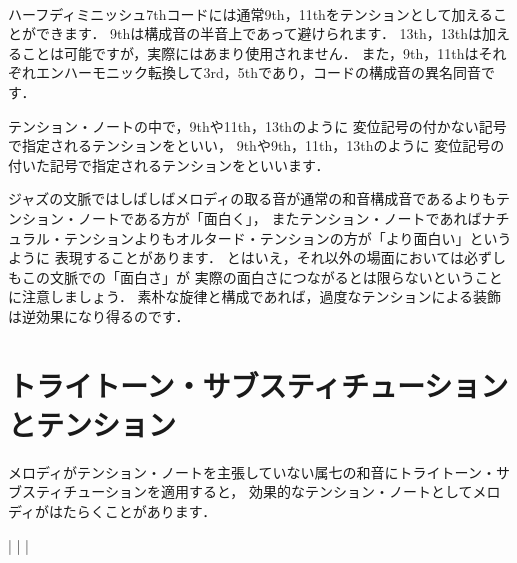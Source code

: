 \documentclass[dvipdfmx,uplatex,b5paper,openany,jbase=12Q,nomag*,textwidth-limit=44%
               ]{gachimuchi}
\begin{document}
\begin{description}
\begin{Music}
    \en%
    \endpiece
  \end{Music}
  \item[ハーフディミニッシュ7thコード] ~\\
  ハーフディミニッシュ7thコードには通常9th，11thをテンションとして加えることができます．
  \bFlat9thは構成音の半音上であって避けられます．
  \bFlat13th，\bNatural13thは加えることは可能ですが，実際にはあまり使用されません．
  また，\bSharp 9th，\bSharp 11thはそれぞれエンハーモニック転換して\bFlat 3rd，\bFlat 5thであり，コードの構成音の異名同音です．
  \begin{Music}
    \nostartrule%
    \Startpiece
    \Notes%
    \en%
    \endpiece
  \end{Music}
\end{description}

テンション・ノートの中で，9thや11th，13thのように
変位記号の付かない記号で指定されるテンションをといい，
\bFlat9thや\bSharp 9th，\bSharp 11th，\bFlat13thのように
変位記号の付いた記号で指定されるテンションをといいます．

ジャズの文脈ではしばしばメロディの取る音が通常の和音構成音であるよりもテンション・ノートである方が「面白く」，
またテンション・ノートであればナチュラル・テンションよりもオルタード・テンションの方が「より面白い」というように
表現することがあります．
とはいえ，それ以外の場面においては必ずしもこの文脈での「面白さ」が
実際の面白さにつながるとは限らないということに注意しましょう．
素朴な旋律と構成であれば，過度なテンションによる装飾は逆効果になり得るのです．

\section{トライトーン・サブスティチューションとテンション}
メロディがテンション・ノートを主張していない属七の和音にトライトーン・サブスティチューションを適用すると，
効果的なテンション・ノートとしてメロディがはたらくことがあります．
\begin{Music}
  \Startpiece
  \Notes%
  |\figbassu[8]%
  \figbassu[9]%
  \figbassu[3]%
  \figbassu[11]%
  \figbassu[5]%
  \figbassu[6]%
  \figbassu[\bFlat7]%
  \en\bar%
  \Notes%
  |\figbassu[\bSharp11]%
  \figbassu[\bSharp5][\bFlat13]%
  \figbassu[\bFlat7]%
  \figbassu[\bNatural7]%
  \figbassu[\bFlat9]%
  \figbassu[\bSharp9]%
  \figbassu[3]%
  \en
  \endpiece
\end{Music}
\end{document}
